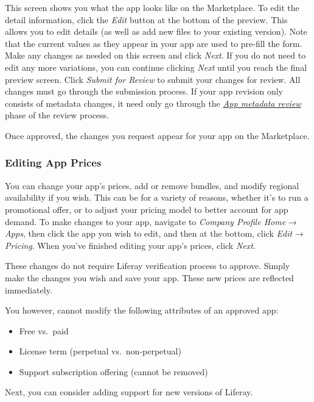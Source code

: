 This screen shows you what the app looks like on the Marketplace. To
edit the detail information, click the \emph{Edit} button at the bottom
of the preview. This allows you to edit details (as well as add new
files to your existing version). Note that the current values as they
appear in your app are used to pre-fill the form. Make any changes as
needed on this screen and click \emph{Next}. If you do not need to edit
any more variations, you can continue clicking \emph{Next} until you
reach the final preview screen. Click \emph{Submit for Review} to submit
your changes for review. All changes must go through the submission
process. If your app revision only consists of metadata changes, it need
only go through the
\href{/distribute/how-to-publish/-/knowledge_base/how-to-publish/understanding-the-app-review-process}{\emph{App
metadata review}} phase of the review process.

Once approved, the changes you request appear for your app on the
Marketplace.

\subsubsection{Editing App Prices}\label{editing-app-prices}

You can change your app's prices, add or remove bundles, and modify
regional availability if you wish. This can be for a variety of reasons,
whether it's to run a promotional offer, or to adjust your pricing model
to better account for app demand. To make changes to your app, navigate
to \emph{Company Profile Home} → \emph{Apps}, then click the app you
wish to edit, and then at the bottom, click \emph{Edit} →
\emph{Pricing}. When you've finished editing your app's prices, click
\emph{Next}.

These changes do not require Liferay verification process to approve.
Simply make the changes you wish and save your app. These new prices are
reflected immediately.

You however, cannot modify the following attributes of an approved app:

\begin{itemize}
\tightlist
\item
  Free vs.~paid
\item
  License term (perpetual vs.~non-perpetual)
\item
  Support subscription offering (cannot be removed)
\end{itemize}

Next, you can consider adding support for new versions of Liferay.

